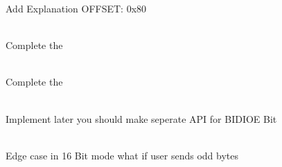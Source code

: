 \begin{DoxyRefList}
\label{todo__todo000123}%
%
Add Explanation OFFSET\+: 0x80  
\item[{\parbox[t]{\linewidth}{Member \doxylink{stm32f407xx__spi_8c_a711dae34a1a0be49f23fc5c47c557bb0}{SPI\+\_\+\+CRC\+\_\+\+Err\+\_\+\+IRQ\+\_\+\+Helper} (\doxylink{struct_s_p_ix___handle__t}{SPIx\+\_\+\+Handle\+\_\+t} \texorpdfstring{$\ast$}{*}p\+Handle)}}]\hfill \\
\label{todo__todo000064}%
%
Complete the   
\item[{\parbox[t]{\linewidth}{Member \doxylink{stm32f407xx__spi_8c_ab673d1d7ae262269e02b80a3dd2b3af4}{SPI\+\_\+\+MODF\+\_\+\+Err\+\_\+\+IRQ\+\_\+\+Helper} (\doxylink{struct_s_p_ix___handle__t}{SPIx\+\_\+\+Handle\+\_\+t} \texorpdfstring{$\ast$}{*}p\+Handle)}}]\hfill \\
\label{todo__todo000065}%
%
Complete the   
\item[{\parbox[t]{\linewidth}{Member \doxylink{group___s_p_i___a_p_i___p_r_o_t_o_t_y_p_e_s_gab01fdd1c8bc842ad1e9017997c73722c}{SPIx\+\_\+\+Init} (\doxylink{struct_s_p_ix___handle__t}{SPIx\+\_\+\+Handle\+\_\+t} \texorpdfstring{$\ast$}{*}p\+SPI\+\_\+\+Handle)}}]\hfill \\
\label{todo__todo000066}%
%
Implement later you should make seperate API for BIDIOE Bit  
\item[{\parbox[t]{\linewidth}{Member \doxylink{group___s_p_i___a_p_i___p_r_o_t_o_t_y_p_e_s_ga49a1accdcb1df29926a4f4c4cdfb334e}{SPIx\+\_\+\+Receive\+Data\+\_\+\+Blocking} (\doxylink{struct_s_p_ix___reg_def__t}{SPIx\+\_\+\+Reg\+Def\+\_\+t} \texorpdfstring{$\ast$}{*}p\+SPIx, uint8\+\_\+t \texorpdfstring{$\ast$}{*}p\+RX\+\_\+\+Data\+\_\+\+Buffer, uint32\+\_\+t Len\+\_\+\+Byte)}}]\hfill \\
\label{todo__todo000067}%
%
Edge case in 16 Bit mode what if user sends odd bytes  
\item[{\parbox[t]{\linewidth}{Member \doxylink{group___s_p_i___a_p_i___p_r_o_t_o_t_y_p_e_s_ga185a067739ac2ed3d3115a03ceee35a3}{SPIx\+\_\+\+Receive\+Data\+IT} (\doxylink{struct_s_p_ix___handle__t}{SPIx\+\_\+\+Handle\+\_\+t} \texorpdfstring{$\ast$}{*}p\+Handle, uint8\+\_\+t \texorpdfstring{$\ast$}{*}p\+Rx\+Buf, uint32\+\_\+t Len)}}]\hfill \\

\end{DoxyRefList}
